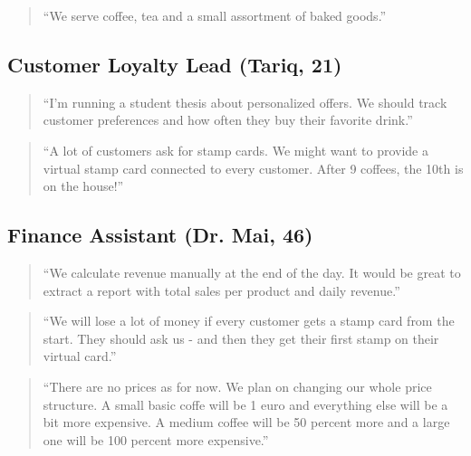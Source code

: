 \begin{quote}
    “We serve coffee, tea and a small assortment of baked goods.”
\end{quote}

\subsection{Customer Loyalty Lead (Tariq, 21)}

\begin{quote}
    “I’m running a student thesis about personalized offers. We should track customer preferences and how often they buy their favorite drink.”
\end{quote}

\begin{quote}
    “A lot of customers ask for stamp cards. We might want to provide a virtual stamp card connected to every customer. After 9 coffees, the 10th is on the house!”
\end{quote}

\subsection{Finance Assistant (Dr. Mai, 46)}

\begin{quote}
    “We calculate revenue manually at the end of the day. It would be great to extract a report with total sales per product and daily revenue.”
\end{quote}

\begin{quote}
    “We will lose a lot of money if every customer gets a stamp card from the start. They should ask us - and then they get their first stamp on their virtual card.”
\end{quote}

\begin{quote}
    “There are no prices as for now. We plan on changing our whole price structure. A small basic coffe will be 1 euro and everything else will be a bit more expensive. A medium coffee will be 50 percent more and a large one will be 100 percent more expensive.”
\end{quote}